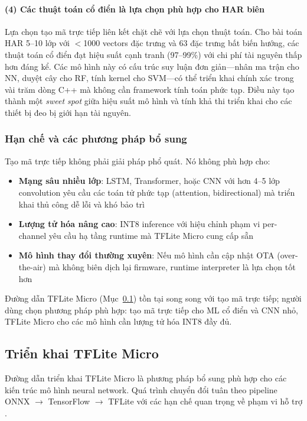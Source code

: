 \paragraph{(4) Các thuật toán cổ điển là lựa chọn phù hợp cho HAR biên}
Lựa chọn tạo mã trực tiếp liên kết chặt chẽ với lựa chọn thuật toán. Cho bài toán HAR 5--10 lớp với $<$1000 vectors đặc trưng và 63 đặc trưng bất biến hướng, các thuật toán cổ điển đạt hiệu suất cạnh tranh (97--99\%) với chi phí tài nguyên thấp hơn đáng kể. Các mô hình này có cấu trúc suy luận đơn giản---nhân ma trận cho NN, duyệt cây cho RF, tính kernel cho SVM---có thể triển khai chính xác trong vài trăm dòng C++ mà không cần framework tính toán phức tạp. Điều này tạo thành một \textit{sweet spot} giữa hiệu suất mô hình và tính khả thi triển khai cho các thiết bị đeo bị giới hạn tài nguyên.

\subsubsection{Hạn chế và các phương pháp bổ sung}
Tạo mã trực tiếp không phải giải pháp phổ quát. Nó không phù hợp cho:
\begin{itemize}
    \item \textbf{Mạng sâu nhiều lớp}: LSTM, Transformer, hoặc CNN với hơn 4--5 lớp convolution yêu cầu các toán tử phức tạp (attention, bidirectional) mà triển khai thủ công dễ lỗi và khó bảo trì
    \item \textbf{Lượng tử hóa nâng cao}: INT8 inference với hiệu chỉnh phạm vi per-channel yêu cầu hạ tầng runtime mà TFLite Micro cung cấp sẵn
    \item \textbf{Mô hình thay đổi thường xuyên}: Nếu mô hình cần cập nhật OTA (over-the-air) mà không biên dịch lại firmware, runtime interpreter là lựa chọn tốt hơn
\end{itemize}
Đường dẫn TFLite Micro (Mục~\ref{sec:tflite_micro_deployment}) tồn tại song song với tạo mã trực tiếp; người dùng chọn phương pháp phù hợp: tạo mã trực tiếp cho ML cổ điển và CNN nhỏ, TFLite Micro cho các mô hình cần lượng tử hóa INT8 đầy đủ.

\subsection{Triển khai TFLite Micro}
\label{sec:tflite_micro_deployment}

Đường dẫn triển khai TFLite Micro là phương pháp bổ sung phù hợp cho các kiến trúc mô hình neural network. Quá trình chuyển đổi tuân theo pipeline ONNX $\to$ TensorFlow $\to$ TFLite với các hạn chế quan trọng về phạm vi hỗ trợ \cite{tensorflow2015_whitepaper}.

